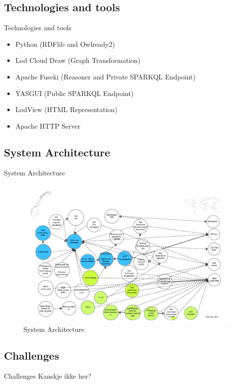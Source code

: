 \documentclass{beamer}
\begin{document}
	\subsection{Technologies and tools}
	\begin{frame}{Technologies and tools}
		\begin{itemize}
			\item Python (RDFlib and Owlready2)
			\item Lod Cloud Draw (Graph Transformation)
			\item Apache Fuseki (Reasoner and Private SPARKQL Endpoint)
			\item YASGUI (Public SPARKQL Endpoint)
			\item LodView (HTML Representation)
			\item Apache HTTP Server
		\end{itemize}
	\end{frame}

	\subsection{System Architecture}
	\begin{frame}{System Architecture}
		\begin{figure}
			\includegraphics[scale=0.19]{resources/norwegian-lod.png}
			\caption{System Architecture}
		\end{figure}
	\end{frame}

	\subsection{Challenges}
	\begin{frame}{Challenges}
		Kanskje ikke her?
	\end{frame}
\end{document}
